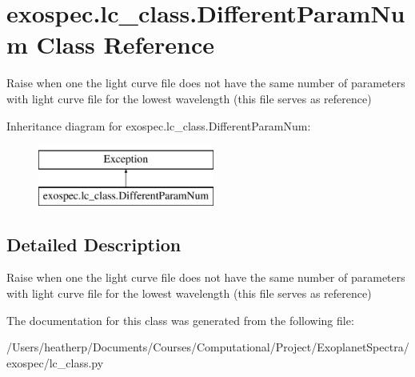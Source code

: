 \hypertarget{classexospec_1_1lc__class_1_1_different_param_num}{}\section{exospec.\+lc\+\_\+class.\+Different\+Param\+Num Class Reference}
\label{classexospec_1_1lc__class_1_1_different_param_num}


Raise when one the light curve file does not have the same number of parameters with light curve file for the lowest wavelength (this file serves as reference)  


Inheritance diagram for exospec.\+lc\+\_\+class.\+Different\+Param\+Num\+:\begin{figure}[H]
\begin{center}
\leavevmode
\includegraphics[height=2.000000cm]{classexospec_1_1lc__class_1_1_different_param_num}
\end{center}
\end{figure}


\subsection{Detailed Description}
Raise when one the light curve file does not have the same number of parameters with light curve file for the lowest wavelength (this file serves as reference) 

The documentation for this class was generated from the following file\+:\begin{DoxyCompactItemize}
\item 
/\+Users/heatherp/\+Documents/\+Courses/\+Computational/\+Project/\+Exoplanet\+Spectra/exospec/lc\+\_\+class.\+py\end{DoxyCompactItemize}
